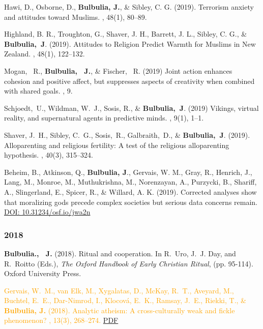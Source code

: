 \documentclass{article}
\begin{document}
\begin{thebibliography}{99}
Hawi, D., Osborne, D., {\bf Bulbulia, J.}, \& Sibley, C. G. (2019). 
\newblock Terrorism anxiety and attitudes toward Muslims. 
, 48(1), 80--89.


Highland, B. R., Troughton, G., Shaver, J. H., Barrett, J. L., Sibley, C. G., \&
{\bf Bulbulia,~J}. (2019).
\newblock  Attitudes to Religion Predict Warmth for Muslims in New Zealand.
,  48(1), 122--132.


Mogan, ~R., {\bf Bulbulia, ~J.}, \& Fischer, ~R. (2019)
\newblock Joint action enhances cohesion and positive affect, but suppresses aspects of creativity when combined with shared goals.
, 9.


Schjoedt,~U., Wildman, W.~J., Sosis, R., \& {\bf Bulbulia,~J}. (2019)
\newblock Vikings, virtual reality, and supernatural agents in predictive
  minds.
, 9(1), 1--1.


Shaver, J.~H., Sibley, C.~G., Sosis,~R., Galbraith,~D., \&  {\bf Bulbulia,~J}. (2019).
\newblock Alloparenting and religious fertility: A test of the religious
  alloparenting hypothesis.
, 40(3), 315--324. 


Beheim, B., Atkinson, Q., {\bf Bulbulia, J}., Gervais, W. M., Gray, R., Henrich, J., Lang, M., Monroe, M., Muthukrishna, M., Norenzayan, A., Purzycki, B., Shariff, A., Slingerland, E., Spicer, R., \& Willard, A. K. (2019).
\newblock Corrected analyses show that moralizing gods precede complex societies but serious data concerns remain. 
\href{https://doi.org/10.31234/osf.io/jwa2n}{DOI: 10.31234/osf.io/jwa2n}


\subsubsection*{2018}
{\bf Bulbulia., ~J.} (2018).
\newblock Ritual and cooperation.
\newblock In R.~Uro, J.~J. Day, and R.~Roitto (Eds.), {\em The Oxford
  Handbook of Early Christian Ritual}, (pp. 95-114). Oxford University Press. 


\textcolor{Orange}{Gervais, W.~M., van Elk, M., Xygalatas, D., McKay, R.~T., Aveyard, M., Buchtel,
  E.~E., Dar-Nimrod, I., Klocov{\'a}, E.~K., Ramsay, J.~E., Riekki, T., \& {\bf Bulbulia, J.} (2018).
\newblock Analytic atheism: A cross-culturally weak and fickle phenomenon?
, 13(3), 268--274.}
\href{https://www.dropbox.com/s/0sltfq9mtgzqlxm/Gervaisetal.2018AnalyticAtheism.pdf?dl=0}{PDF}%



\end{thebibliography}
\end{document}
